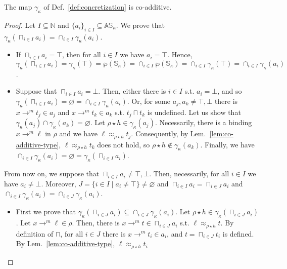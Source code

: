 \begin{lemma}\label{lem:co-additive}
  The map $\gamma_\kappa$ of Def.~\ref{def:concretization} is co-additive.
\end{lemma}
\begin{proof}
  Let $I\subseteq\mathbb{N}$ and $\{a_i\}_{i\in I}\subseteq\mathbb{AS}_\kappa$.
  We prove that $\gamma_\kappa(\sqcap_{i\in I}a_i)=\cap_{i\in I}\gamma_\kappa(a_i)$.
  \begin{itemize}
    \item If $\sqcap_{i\in I}a_i=\top$, then for all $i\in I$ we have $a_i=\top$.
    Hence, $\gamma_\kappa(\sqcap_{i\in I}a_i) =
    \gamma_\kappa(\top) =
    \wp(\mathbb{S}_\kappa) =
    \cap_{i\in I}\wp(\mathbb{S}_\kappa) =
    \cap_{i\in I}\gamma_\kappa(\top) =
    \cap_{i\in I}\gamma_\kappa(a_i)$.
    \item Suppose that $\sqcap_{i\in I}a_i=\bot$. Then, either there is $i\in I$ s.t.
    $a_i=\bot$, and so $\gamma_\kappa(\sqcap_{i\in I}a_i) = \varnothing =
    \cap_{i\in I}\gamma_\kappa(a_i)$. Or, for some $a_j,a_k\not=\top,\bot$
    there is $x\to^m t_j\in a_j$ and $x\to^m t_k\in a_k$ s.t.
    $t_j\sqcap t_k$ is undefined. Let us show that
    $\gamma_\kappa(a_j)\cap\gamma_\kappa(a_k)=\varnothing$.
    Let $\rho\star h\in\gamma_\kappa(a_j)$.
    Necessarily, there is a binding $x\to^m\ell$ in $\rho$ and
    we have $\ell\approx_{\rho\star h}t_j$.
    Consequently, by Lem.~\ref{lem:co-additive-type},
    $\ell\approx_{\rho\star h}t_k$ does not hold, so
    $\rho\star h\not\in\gamma_\kappa(a_k)$.
    Finally, we have $\cap_{i\in I}\gamma_\kappa(a_i) = \varnothing =
    \gamma_\kappa(\sqcap_{i\in I}a_i)$.
  \end{itemize}
  From now on, we suppose that $\sqcap_{i\in I}a_i\not=\top,\bot$.
  Then, necessarily, for all $i\in I$ we have $a_i\not=\bot$.
  Moreover, $J=\{i\in I\mid a_i\neq\top\}\not=\varnothing$ and
  $\sqcap_{i\in I}a_i = \sqcap_{i\in J}a_i$ and
  $\cap_{i\in I}\gamma_\kappa(a_i)=\cap_{i\in J}\gamma_\kappa(a_i)$.
  \begin{itemize}
    \item First we prove that
    $\gamma_\kappa(\sqcap_{i\in J}a_i)\subseteq\cap_{i\in J}\gamma_\kappa(a_i)$.
    Let $\rho\star h\in\gamma_\kappa(\sqcap_{i\in J}a_i)$.
    Let $x\to^m\ell\in\rho$. Then, there is $x\to^m t\in \sqcap_{i\in J}a_i$ s.t.
    $\ell\approx_{\rho\star h}t$. By definition of $\sqcap$, for all $i\in J$
    there is $x\to^m t_i\in a_i$, and $t=\sqcap_{i\in J}t_i$ is defined.
    By Lem.~\ref{lem:co-additive-type}, $\ell\approx_{\rho\star h}t_i$

\end{itemize}
\end{proof}
